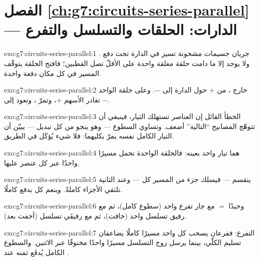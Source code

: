 \section*{الفصل \ref{ch:g7:circuits-series-parallel} --- الدارات: الحلقات والتسلسل والتفرع}

\begin{solution}{exo:g7:circuits-series-parallel:1}
جريان جسيمات مشحونة تسير في الدارة تحت دفع . ولا يوجد
إلا ما دامت حلقة مغلقة واحدة على الأقلّ تصل القطبين؛ فافتح
الحلقة يتوقّف المسير في كل مكان دفعة واحدة.
\end{solution}

\begin{solution}{exo:g7:circuits-series-parallel:2}
خارج ، من $+$ حول الدارة إلى $-$. وعلى حلقة 
الواحد تغادر الأسهم $+$، وتمرّ ، وتعود إلى $-$.
\end{solution}

\begin{solution}{exo:g7:circuits-series-parallel:3}
الخطأ القائل إن العناصر تستهلك التيار، فينبغي أن تتوهّج
المصابيح ``التالية'' أضعف. وتساوي السطوع --- وهو ينجو من كل
تبديل --- يبيّن أن التيار الكامل نفسه يمرّ بكليهما: فلا شيء
يُؤكَل في الطريق.
\end{solution}

\begin{solution}{exo:g7:circuits-series-parallel:4}
هما تيار واحد بعينه: فالحلقة الواحدة تحمل مسيرًا واحدًا عبر كل
عنصر عليها.
\end{solution}

\begin{solution}{exo:g7:circuits-series-parallel:5}
ينقسم --- فيسلك جزء من المسير كل  --- وعند  الثانية
تلتقي الأجزاء كاملةً. وينعم كل  بدفع  كاملًا.
\end{solution}

\begin{solution}{exo:g7:circuits-series-parallel:6}
وحيدًا $=$ مع جار تفرع واحد (سطوع كامل)، ثم مع رفيق تسلسل واحد
(خافت)، ثم مع رفيقَي تسلسل (أخفت بعد).
\end{solution}

\begin{solution}{exo:g7:circuits-series-parallel:7}
التفرع: ففرعان يسحب كل واحد مسيرًا كاملًا يضاعفان تسليم
 الكلّي، بينما يرسل زوج التسلسل مسيرًا واحدًا مخنوقًا
عبر الاثنين. والسطوع الكامل يُدفَع ثمنه عند .
\end{solution}

